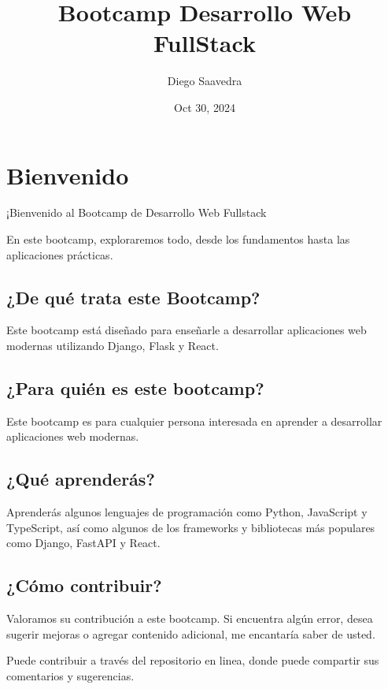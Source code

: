 \documentclass[
  a4paper,
  DIV=11,
  numbers=noendperiod,
  onepage,
  openany]{scrreprt}
\title{Bootcamp Desarrollo Web FullStack}
\author{Diego Saavedra}
\date{Oct 30, 2024}
\renewcommand*\contentsname{Table of contents}
\newcommand\contentsname{Table of contents}
\begin{document}
\maketitle

\renewcommand*\contentsname{Table of contents}
{
\hypersetup{linkcolor=}
\setcounter{tocdepth}{2}
\tableofcontents
}
\chapter{Bienvenido}\label{bienvenido}

¡Bienvenido al Bootcamp de Desarrollo Web Fullstack

En este bootcamp, exploraremos todo, desde los fundamentos hasta las
aplicaciones prácticas.

\section{¿De qué trata este
Bootcamp?}\label{de-quuxe9-trata-este-bootcamp}

Este bootcamp está diseñado para enseñarle a desarrollar aplicaciones
web modernas utilizando Django, Flask y React.

\section{¿Para quién es este
bootcamp?}\label{para-quiuxe9n-es-este-bootcamp}

Este bootcamp es para cualquier persona interesada en aprender a
desarrollar aplicaciones web modernas.

\section{¿Qué aprenderás?}\label{quuxe9-aprenderuxe1s}

Aprenderás algunos lenguajes de programación como Python, JavaScript y
TypeScript, así como algunos de los frameworks y bibliotecas más
populares como Django, FastAPI y React.

\section{¿Cómo contribuir?}\label{cuxf3mo-contribuir}

Valoramos su contribución a este bootcamp. Si encuentra algún error,
desea sugerir mejoras o agregar contenido adicional, me encantaría saber
de usted.

Puede contribuir a través del repositorio en linea, donde puede
compartir sus comentarios y sugerencias.
\end{document}
